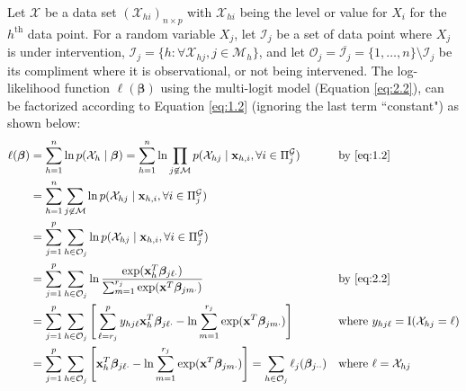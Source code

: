 \documentclass[twoside,11pt]{article}
\let\mc\mathcal
\let\mbf\mathbf
\begin{document}
Let $\mc{X}$ be a data set $(\mc{X}_{hi})_{n\times p}$ with $\mc{X}_{hi}$ being the level or value for $X_i$ for the $h^\text{th}$ data point. For a random variable $X_j$, let $\mc{I}_j$ be a set of data point where $X_j$ is under intervention, $\mc{I}_j = \{h : \forall\mc{X}_{hj}, j \in \mc{M}_h\}$, and let $\mc{O}_j=\overline{\mc{I}_j}=\{1,\dots,n\}\setminus\mc{I}_j$ be its compliment where it is observational, or not being intervened. The log-likelihood function $\ell(\bm\beta)$  using the multi-logit model (Equation \eqref{eq:2.2}), can be factorized according to Equation \eqref{eq:1.2} (ignoring the last term ``constant") as shown below:
\begin{align}
    \ell(\bm\beta)&%
    =\sum_{h=1}^n{\ln p(\mc{X}_{h} \mid \bm\beta)}
    =\sum_{h=1}^n{ \ln\prod_{j\not\in{\mc{M}}}{p(\mc{X}_{hj} \mid \mbf{x}_{h,i},\forall{i}\in\Pi_j^\mc{G})} } && \text{by \eqref{eq:1.2}} \nonumber
    \\&
    =\sum_{h=1}^n{ \sum_{j\not\in{\mc{M}}}{ \ln p(\mc{X}_{hj} \mid \mbf{x}_{h,i},\forall{i}\in\Pi_j^\mc{G})} }
    \nonumber
    \\&
    =\sum_{j=1}^p{\sum_{h\in\mc{O}_j}{ \ln p(\mc{X}_{hj} \mid \mbf{x}_{h,i},\forall{i}\in\Pi_j^\mc{G})} }\nonumber\\ 
    &=\sum_{j=1}^p{\sum_{h\in\mc{O}_j}{
        \ln\frac{\exp(\mbf{x}_h^T \bm{\beta}_{j\ell\cdot})}{\sum_{m=1}^{r_j}\exp(\mbf{x}^T \bm{\beta}_{jm\cdot})}
    }} && \text{by \eqref{eq:2.2}}\nonumber\\
    &=\sum_{j=1}^p{\sum_{h\in\mc{O}_j}{\Bigg[
        \sum_{\ell=r_j}^p y_{hj\ell}\mbf{x}_h^T \bm{\beta}_{j\ell\cdot} -\ln{\sum_{m=1}^{r_j}\exp(\mbf{x}^T \bm{\beta}_{jm\cdot})}\Bigg]
    }} && \text{where $y_{hj\ell}=\text{I}(\mc{X}_{hj}=\ell)$}
    \nonumber\\%
    &=\sum_{j=1}^p{\sum_{h\in\mc{O}_j}{\Bigg[
        \mbf{x}_h^T \bm{\beta}_{j\ell\cdot} -\ln{\sum_{m=1}^{r_j}\exp(\mbf{x}^T \bm{\beta}_{jm\cdot})}\Bigg]
    }} =\sum_{h\in\mc{O}_j}{\ell_j(\bm\beta_{j\cdot\cdot})} && \text{where $\ell=\mc{X}_{hj}$}
    \label{eq:2.7}
\end{align}
\end{document}
